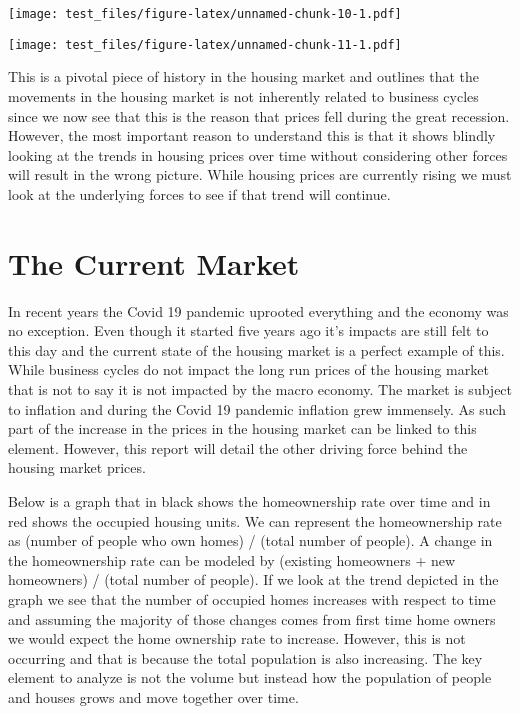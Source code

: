 \documentclass[
]{article}
\begin{document}
\texttt{[image: test\_files/figure-latex/unnamed-chunk-10-1.pdf]}

\texttt{[image: test\_files/figure-latex/unnamed-chunk-11-1.pdf]}

This is a pivotal piece of history in the housing market and outlines
that the movements in the housing market is not inherently related to
business cycles since we now see that this is the reason that prices
fell during the great recession. However, the most important reason to
understand this is that it shows blindly looking at the trends in
housing prices over time without considering other forces will result in
the wrong picture. While housing prices are currently rising we must
look at the underlying forces to see if that trend will continue.

\section{The Current Market}\label{the-current-market}

In recent years the Covid 19 pandemic uprooted everything and the
economy was no exception. Even though it started five years ago it's
impacts are still felt to this day and the current state of the housing
market is a perfect example of this. While business cycles do not impact
the long run prices of the housing market that is not to say it is not
impacted by the macro economy. The market is subject to inflation and
during the Covid 19 pandemic inflation grew immensely. As such part of
the increase in the prices in the housing market can be linked to this
element. However, this report will detail the other driving force behind
the housing market prices.

Below is a graph that in black shows the homeownership rate over time
and in red shows the occupied housing units. We can represent the
homeownership rate as (number of people who own homes) / (total number
of people). A change in the homeownership rate can be modeled by
(existing homeowners + new homeowners) / (total number of people). If we
look at the trend depicted in the graph we see that the number of
occupied homes increases with respect to time and assuming the majority
of those changes comes from first time home owners we would expect the
home ownership rate to increase. However, this is not occurring and that
is because the total population is also increasing. The key element to
analyze is not the volume but instead how the population of people and
houses grows and move together over time.
\end{document}
